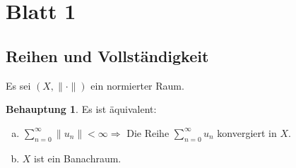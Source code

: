 \documentclass[ngerman]{article}
\theoremstyle{definition}%
\newtheorem*{beh}{Behauptung}
\newcommand{\df}{\Rightarrow} %
\renewcommand{\{ }{\left\lbrace}
\renewcommand{\}}{\right\rbrace}
\begin{document}
\tableofcontents
\newpage

\section{Blatt 1}

\subsection{Reihen und Vollständigkeit}
Es sei $(X, \|\cdot\|)$ ein normierter Raum.
\begin{beh}
Es ist äquivalent:
\begin{enumerate}[(a)]
	\item	$\sum^\infty_{n=0} \|u_n\|<\infty\df$ Die Reihe $\sum^\infty_{n=0}u_n$ konvergiert in $X$.
	\item	$X$ ist ein Banachraum.
\end{enumerate}
\end{beh}
\end{document}

